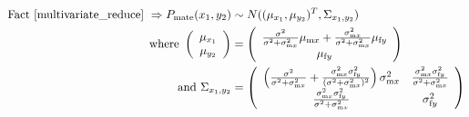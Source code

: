 \documentclass{article}
\newcommand{\x}[1]{\text{#1}}
\begin{document}
\begin{align*}
\text{Fact \ref{multivariate_reduce} } \Rightarrow P_\text{mate}(x_1,y_2)&\sim N((\mu_{x_1},\mu_{y_2})^T,\Sigma_{x_1,y_2})
\\ \text{ where } \left(\begin{array}{c}\mu_{x_1} \\ \mu_{y_2} \end{array}\right)&=\left(\begin{array}{c}\frac{\sigma^2}{\sigma^2+\sigma_{\x{m}x}^2}\mu_{\x{m}x}+\frac{\sigma_{\x{m}x}^2}{\sigma^2+\sigma_{\x{m}x}^2}\mu_{\x{f}y} \\ \mu_{\x{f}y} \end{array}\right)
\\ \text{ and } \Sigma_{x_1,y_2}&=\left(\begin{array}{cc}\left(\frac{\sigma^2}{\sigma^2+\sigma_{\x{m}x}^2}+\frac{\sigma_{\x{m}x}^2\sigma_{\x{f}y}^2}{(\sigma^2+\sigma_{\x{m}x}^2)^2}\right)\sigma_{\x{m}x}^2 & \frac{\sigma_{\x{m}x}^2\sigma_{\x{f}y}^2}{\sigma^2+\sigma_{\x{m}x}^2} \\ \frac{\sigma_{\x{m}x}^2\sigma_{\x{f}y}^2}{\sigma^2+\sigma_{\x{m}x}^2} & \sigma_{\x{f}y}^2 \end{array}\right)
\end{align*}
\end{document}
